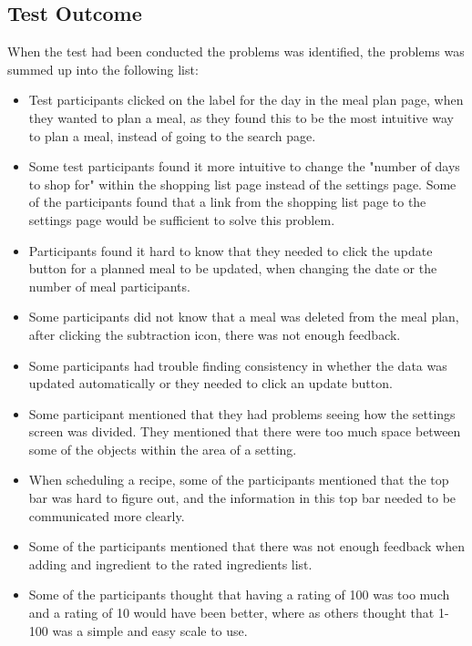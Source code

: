 \subsection{Test Outcome}

When the test had been conducted the problems was identified, the problems was summed up into the following list:

\begin{itemize}
    \item Test participants clicked on the label for the day in the meal plan page, when they wanted to plan a meal, as they found this to be the most intuitive way to plan a meal, instead of going to the search page.
    \item Some test participants found it more intuitive to change the "number of days to shop for" within the shopping list page instead of the settings page. Some of the participants found that a link from the shopping list page to the settings page would be sufficient to solve this problem.
    \item Participants found it hard to know that they needed to click the update button for a planned meal to be updated, when changing the date or the number of meal participants.
    \item Some participants did not know that a meal was deleted from the meal plan, after clicking the subtraction icon, there was not enough feedback.
    \item Some participants had trouble finding consistency in whether the data was updated automatically or they needed to click an update button.
    \item Some participant mentioned that they had problems seeing how the settings screen was divided. They mentioned that there were too much space between some of the objects within the area of a setting.
    \item When scheduling a recipe, some of the participants mentioned that the top bar was hard to figure out, and the information in this top bar needed to be communicated more clearly.
    \item Some of the participants mentioned that there was not enough feedback when adding and ingredient to the rated ingredients list.
    \item Some of the participants thought that having a rating of 100 was too much and a rating of 10 would have been better, where as others thought that 1-100 was a simple and easy scale to use.
\end{itemize}

